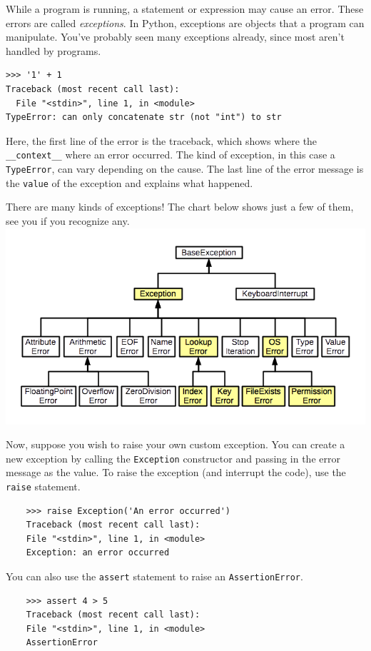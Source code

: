 While a program is running, a statement or expression may cause an error.
These errors are called \textit{exceptions}. In Python, exceptions are objects that a program can manipulate.
You've probably seen many exceptions already, since most aren't handled by programs.
\vspace{0.5mm}
\begin{lstlisting}
>>> '1' + 1
Traceback (most recent call last):
  File "<stdin>", line 1, in <module>
TypeError: can only concatenate str (not "int") to str
\end{lstlisting}
Here, the first line of the error is the traceback, which shows where the \lstinline{__context__} where an error occurred.
The kind of exception, in this case a  \lstinline{TypeError}, can vary depending on the cause.
The last line of the error message is the \lstinline{value} of the exception and explains what happened.


There are many kinds of exceptions! The chart below shows just a few of them, see you if you recognize any.
\includegraphics[width=\textwidth]{exceptions-hierarchy.png}

Now, suppose you wish to raise your own custom exception.
You can create a new exception by calling the \lstinline{Exception} constructor and passing in the error message as the value.  
To raise the exception (and interrupt the code), use the \lstinline{raise} statement.
\begin{lstlisting}
    >>> raise Exception('An error occurred')
    Traceback (most recent call last):
    File "<stdin>", line 1, in <module>
    Exception: an error occurred
\end{lstlisting}

You can also use the \lstinline{assert} statement to raise an \lstinline{AssertionError}.
\begin{lstlisting}
    >>> assert 4 > 5
    Traceback (most recent call last):
    File "<stdin>", line 1, in <module>
    AssertionError
\end{lstlisting}

